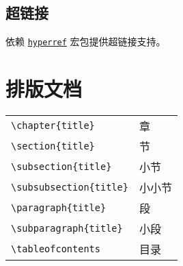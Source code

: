 \documentclass{ctexbook}
\begin{document}
\subsection{超链接}

依赖 \href{https://ctan.org/pkg/hyperref}{\texttt{hyperref}} 宏包提供超链接支持。


\newpage
\section{排版文档}

\begin{table}[h!]
	\centering
	\begin{minipage}[t]{0.46\textwidth}
		\centering
		\begin{tabular}{l l}
			\hline
			\verb|\chapter{|{\color{gray}\verb|title|}\verb|}|       & 章 \\
			\verb|\section{|{\color{gray}\verb|title|}\verb|}|       & 节 \\
			\verb|\subsection{|{\color{gray}\verb|title|}\verb|}|    & 小节 \\
			\verb|\subsubsection{|{\color{gray}\verb|title|}\verb|}| & 小小节 \\
			\verb|\paragraph{|{\color{gray}\verb|title|}\verb|}|     & 段 \\
			\verb|\subparagraph{|{\color{gray}\verb|title|}\verb|}|  & 小段 \\
			\verb|\tableofcontents|                                  & 目录 \\
			\hline
		\end{tabular}
	\end{minipage}
	\qquad
	\begin{minipage}[t]{0.46\textwidth}
		\centering
		\begin{tabular}{l l}
			\hline
			\hline
		\end{tabular}
	\end{minipage}
\end{table}
\end{document}

